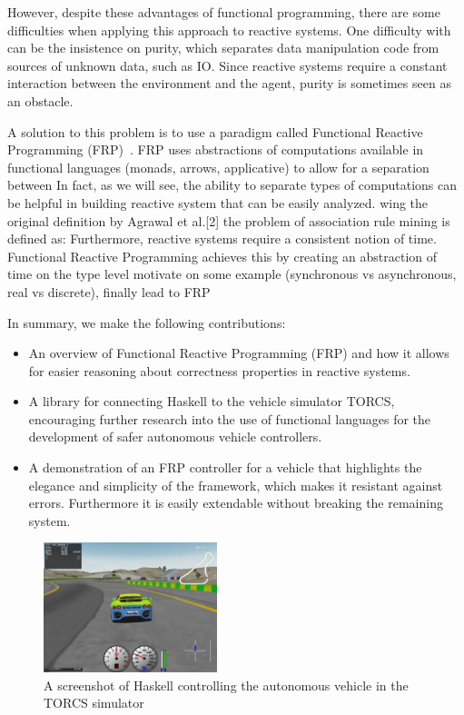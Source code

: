 However, despite these advantages of functional programming, there are some difficulties when applying this approach to reactive systems.
One difficulty with can be the insistence on purity, which separates data manipulation code from sources of unknown data, such as IO.
Since reactive systems require a constant interaction between the environment and the agent, purity is sometimes seen as an obstacle.

A solution to this problem is to use a paradigm called Functional Reactive Programming (FRP)~\cite{hudak2003arrows,hudak2000haskell}.
FRP uses abstractions of computations available in functional languages (\eg monads, arrows, applicative) to allow for a separation between 
In fact, as we will see, the ability to separate types of computations can be helpful in building reactive system that can be easily analyzed.
wing the original definition by Agrawal et al.[2] the problem of association rule mining is defined as:
Furthermore, reactive systems require a consistent notion of time.
Functional Reactive Programming achieves this by creating an abstraction of time on the type level
  motivate on some example (synchronous vs asynchronous, real vs
  discrete), finally lead to FRP

In summary, we make the following contributions:

\begin{itemize}
\item An overview of Functional Reactive Programming (FRP) and how it allows for easier reasoning about correctness properties in reactive systems. 

\item A library for connecting Haskell to the vehicle simulator TORCS, encouraging further research into the use of functional languages for the development of safer autonomous vehicle controllers.

\item A demonstration of an FRP controller for a vehicle that highlights the elegance and simplicity of the framework,
   which makes it resistant against errors. Furthermore it is easily extendable without breaking the remaining system.

\end{itemize}

\begin{figure}[t]
\includegraphics[width=0.45\textwidth]{figs/racing.png}
\caption{A screenshot of Haskell controlling the autonomous vehicle in the TORCS simulator}
\label{fig:race}
\end{figure}
